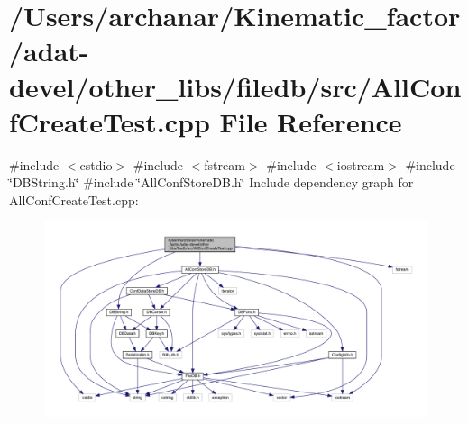 \hypertarget{adat-devel_2other__libs_2filedb_2src_2AllConfCreateTest_8cpp}{}\section{/\+Users/archanar/\+Kinematic\+\_\+factor/adat-\/devel/other\+\_\+libs/filedb/src/\+All\+Conf\+Create\+Test.cpp File Reference}
\label{adat-devel_2other__libs_2filedb_2src_2AllConfCreateTest_8cpp}
{\ttfamily \#include $<$cstdio$>$}\newline
{\ttfamily \#include $<$fstream$>$}\newline
{\ttfamily \#include $<$iostream$>$}\newline
{\ttfamily \#include \char`\"{}D\+B\+String.\+h\char`\"{}}\newline
{\ttfamily \#include \char`\"{}All\+Conf\+Store\+D\+B.\+h\char`\"{}}\newline
Include dependency graph for All\+Conf\+Create\+Test.\+cpp\+:
\nopagebreak
\begin{figure}[H]
\begin{center}
\leavevmode
\includegraphics[width=350pt]{d5/d16/adat-devel_2other__libs_2filedb_2src_2AllConfCreateTest_8cpp__incl}
\end{center}
\end{figure}
